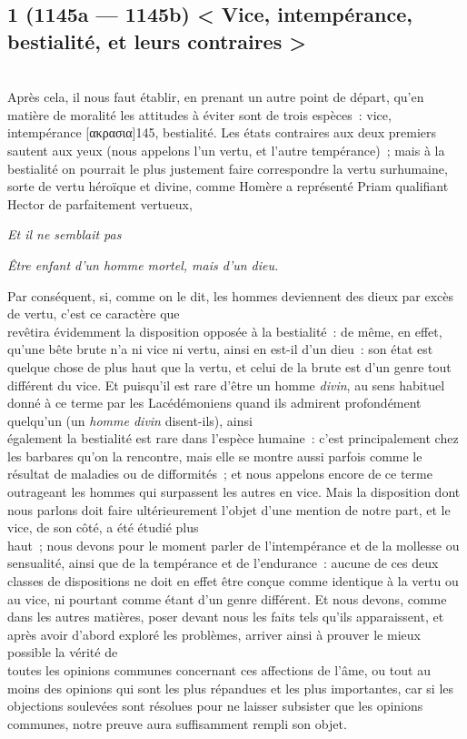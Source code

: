 \documentclass[french,twoside]{book} %
\begin{document}
\subsection[{1 (1145a — 1145b) < Vice, intempérance, bestialité, et leurs contraires >}]{1 (1145a — 1145b) < Vice, intempérance, bestialité, et leurs contraires >}
\noindent \\
Après cela, il nous faut établir, en prenant un autre point de départ, qu’en matière de moralité les attitudes à éviter sont de trois espèces : vice, intempérance [ακρασια]145, bestialité. Les états contraires aux deux premiers sautent aux yeux (nous appelons l’un vertu, et l’autre tempérance) ; mais à la bestialité on pourrait le plus justement faire correspondre la vertu surhumaine, \\
sorte de vertu héroïque et divine, comme Homère a représenté Priam qualifiant Hector de parfaitement vertueux,\par
 {\itshape Et il ne semblait pas} \par
 {\itshape Être enfant d’un homme mortel, mais d’un dieu.} \par
Par conséquent, si, comme on le dit, les hommes deviennent des dieux par excès de vertu, c’est ce caractère que \\
revêtira évidemment la disposition opposée à la bestialité : de même, en effet, qu’une bête brute n’a ni vice ni vertu, ainsi en est-il d’un dieu : son état est quelque chose de plus haut que la vertu, et celui de la brute est d’un genre tout différent du vice. Et puisqu’il est rare d’être un homme {\itshape divin}, au sens habituel donné à ce terme par les Lacédémoniens quand ils admirent profondément quelqu’un (un {\itshape homme divin} disent-ils), ainsi \\
également la bestialité est rare dans l’espèce humaine : c’est principalement chez les barbares qu’on la rencontre, mais elle se montre aussi parfois comme le résultat de maladies ou de difformités ; et nous appelons encore de ce terme outrageant les hommes qui surpassent les autres en vice. Mais la disposition dont nous parlons doit faire ultérieurement l’objet d’une mention de notre part, et le vice, de son côté, a été étudié plus \\
haut ; nous devons pour le moment parler de l’intempérance et de la mollesse ou sensualité, ainsi que de la tempérance et de  l’endurance : aucune de ces deux classes de dispositions ne doit en effet être conçue comme identique à la vertu ou au vice, ni pourtant comme étant d’un genre différent. Et nous devons, comme dans les autres matières, poser devant nous les faits tels qu’ils apparaissent, et après avoir d’abord exploré les problèmes, arriver ainsi à prouver le mieux possible la vérité de \\
toutes les opinions communes concernant ces affections de l’âme, ou tout au moins des opinions qui sont les plus répandues et les plus importantes, car si les objections soulevées sont résolues pour ne laisser subsister que les opinions communes, notre preuve aura suffisamment rempli son objet.
\end{document}
